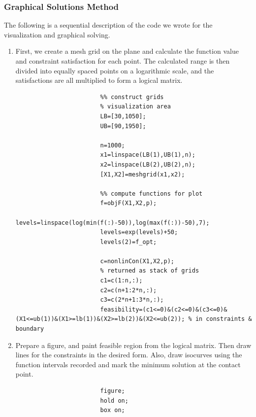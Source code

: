 \documentclass[11pt,twocolumn]{article}
\begin{document}
            \subsubsection{Graphical Solutions Method}
                \label{gsm}
                The following is a sequential description of the code we wrote for the visualization and graphical solving.
                \begin{enumerate}
                    \item First, we create a mesh grid on the plane and calculate the function value and constraint satisfaction for each point. The calculated range is then divided into equally spaced points on a logarithmic scale, and the satisfactions are all multiplied to form a logical matrix.
                    \begin{lstlisting}
                        %% construct grids
                        % visualization area
                        LB=[30,1050];
                        UB=[90,1950];

                        n=1000;
                        x1=linspace(LB(1),UB(1),n);
                        x2=linspace(LB(2),UB(2),n);
                        [X1,X2]=meshgrid(x1,x2);

                        %% compute functions for plot
                        f=objF(X1,X2,p);
                        levels=linspace(log(min(f(:)-50)),log(max(f(:))-50),7);
                        levels=exp(levels)+50;
                        levels(2)=f_opt;

                        c=nonlinCon(X1,X2,p);
                        % returned as stack of grids
                        c1=c(1:n,:);
                        c2=c(n+1:2*n,:);
                        c3=c(2*n+1:3*n,:);
                        feasibility=(c1<=0)&(c2<=0)&(c3<=0)&(X1<=ub(1))&(X1>=lb(1))&(X2>=lb(2))&(X2<=ub(2)); % in constraints & boundary
                    \end{lstlisting}
                    \item Prepare a figure, and paint feasible region from the logical matrix. Then draw lines for the constraints in the desired form. Also, draw isocurves using the function intervals recorded and mark the minimum solution at the contact point.
                    \begin{lstlisting}[firstnumber=last]
                        %% ready figure
                        figure;
                        hold on;
                        box on;


\end{lstlisting}
\end{enumerate}
\end{document}
